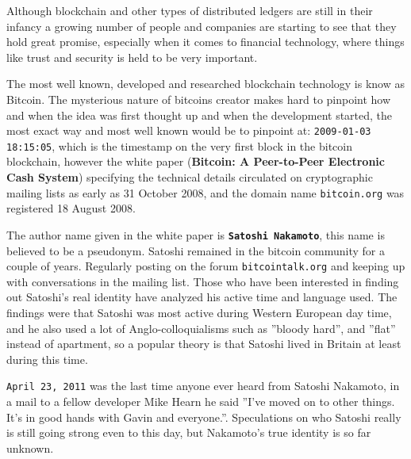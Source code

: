 
Although blockchain and other types of distributed ledgers are still in their infancy a growing number of people and companies are starting to see that they hold great promise, especially when it comes to financial technology, where things like trust and security is held to be very important. 


The most well known, developed and researched blockchain technology is know as Bitcoin. The mysterious nature of bitcoins creator makes hard to pinpoint how and when the idea was first thought up and when the development started, the most exact way and most well known would be to pinpoint at: \texttt{2009-01-03 18:15:05}, which is the timestamp on the very first block in the bitcoin blockchain, however the white paper (\textbf{Bitcoin: A Peer-to-Peer Electronic Cash System}) specifying the technical details circulated on cryptographic mailing lists as early as 31 October 2008, and the domain name \texttt{bitcoin.org} was registered 18 August 2008. 


The author name given in the white paper is \textbf{\texttt{Satoshi Nakamoto}}, this name is believed to be a pseudonym. Satoshi remained in the bitcoin community for a couple of years. Regularly posting on the forum \texttt{bitcointalk.org} and keeping up with conversations in the mailing list. Those who have been interested in finding out Satoshi's real identity have analyzed his active time and language used. The findings were that Satoshi was most active during Western European day time, and he also used a lot of Anglo-colloquialisms such as ''bloody hard'', and ''flat'' instead of apartment, so a popular theory is that Satoshi lived in Britain at least during this time. 

\texttt{April 23, 2011} was the last time anyone ever heard from Satoshi Nakamoto, in a mail to a fellow developer Mike Hearn he said ''I've moved on to other things.  It's in good hands with Gavin and everyone.''. Speculations on who Satoshi really is still going strong even to this day, but Nakamoto's true identity is so far unknown. 


